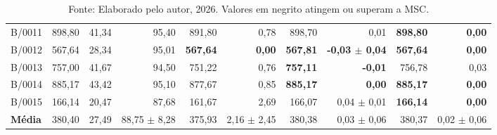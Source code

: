 \begin{table}[htbp]
{\begin{tabular}{l r r r r r r r r r}
      B/0011 & 898,80 & 41,34 & 95,40 & 891,80 & 0,78 & 898,70 & 0,01 & \textbf{898,80} & \textbf{0,00} \\
      B/0012 & 567,64 & 28,34 & 95,01 & \textbf{567,64} & \textbf{0,00} & \textbf{567,81} & \textbf{-0,03 $\pm$ 0,04} & \textbf{567,64} & \textbf{0,00} \\
      B/0013 & 757,00 & 41,67 & 94,50 & 751,22 & 0,76 & \textbf{757,11} & \textbf{-0,01} & 756,78 & 0,03 \\
      B/0014 & 885,17 & 43,42 & 95,10 & 877,67 & 0,85 & \textbf{885,17} & \textbf{0,00} & \textbf{885,17} & \textbf{0,00} \\
      B/0015 & 166,14 & 20,47 & 87,68 & 161,67 & 2,69 & 166,07 & 0,04 $\pm$ 0,01 & \textbf{166,14} & \textbf{0,00} \\
      \midrule
      \textbf{Média} & 380,40 & 27,49 & 88,75 $\pm$ 8,28 & 375,93 & 2,16 $\pm$ 2,45 & 380,38 & 0,03 $\pm$ 0,06 & 380,37 & 0,02 $\pm$ 0,06 \\
      \bottomrule
    \end{tabular}
  }
  \caption*{\footnotesize Fonte: Elaborado pelo autor, 2026. Valores em negrito atingem ou superam a MSC.}
\end{table}
